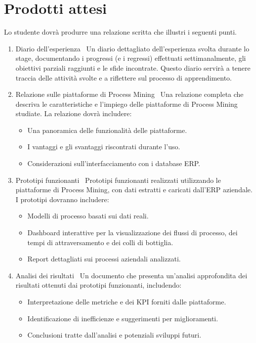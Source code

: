 \section*{Prodotti attesi}
Lo studente dovrà produrre una relazione scritta che illustri i seguenti punti.

\begin{enumerate}
\item Diario dell'esperienza \
Un diario dettagliato dell'esperienza svolta durante lo stage, documentando i progressi (e i regressi) effettuati settimanalmente, gli obiettivi parziali raggiunti e le sfide incontrate. Questo diario servirà a tenere traccia delle attività svolte e a riflettere sul processo di apprendimento.

\item Relazione sulle piattaforme di Process Mining \
Una relazione completa che descriva le caratteristiche e l'impiego delle piattaforme di Process Mining studiate. La relazione dovrà includere:
\begin{itemize}
\item Una panoramica delle funzionalità delle piattaforme.
\item I vantaggi e gli svantaggi riscontrati durante l'uso.
\item Considerazioni sull'interfacciamento con i database ERP.
\end{itemize}

\item Prototipi funzionanti \
Prototipi funzionanti realizzati utilizzando le piattaforme di Process Mining, con dati estratti e caricati dall'ERP aziendale. I prototipi dovranno includere:
\begin{itemize}
\item Modelli di processo basati sui dati reali.
\item Dashboard interattive per la visualizzazione dei flussi di processo, dei tempi di attraversamento e dei colli di bottiglia.
\item Report dettagliati sui processi aziendali analizzati.
\end{itemize}

\item Analisi dei risultati \
Un documento che presenta un'analisi approfondita dei risultati ottenuti dai prototipi funzionanti, includendo:
\begin{itemize}
\item Interpretazione delle metriche e dei KPI forniti dalle piattaforme.
\item Identificazione di inefficienze e suggerimenti per miglioramenti.
\item Conclusioni tratte dall'analisi e potenziali sviluppi futuri.
\end{itemize}


\end{enumerate}
